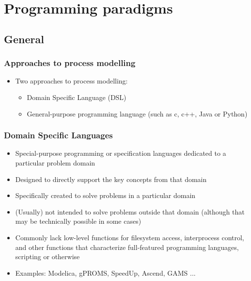 \documentclass{beamer}
\begin{document}
\section{Programming paradigms}

\subsection{General}
\begin{frame}
\frametitle{Approaches to process modelling}
\begin{block}{}
\begin{itemize}
  \item Two approaches to process modelling:
  \begin{itemize}
    \item Domain Specific Language (DSL)
    \item General-purpose programming language (such as c, c++, Java or Python)
  \end{itemize}
\end{itemize}
\end{block}
\end{frame}

\begin{frame}
\frametitle{Domain Specific Languages}
\begin{block}{}
\begin{itemize}
  \item Special-purpose programming or specification languages dedicated to a particular problem domain
  \item Designed to directly support the key concepts from that domain
  \item Specifically created to solve problems in a particular domain
  \item (Usually) not intended to solve problems outside that domain (although that may be technically possible in some cases)
  \item Commonly lack low-level functions for filesystem access, interprocess control, and other functions that characterize 
	full-featured programming languages, scripting or otherwise
  \item Examples: Modelica, gPROMS, SpeedUp, Ascend, GAMS ...
\end{itemize}
\end{block}
\end{frame}
\end{document}

